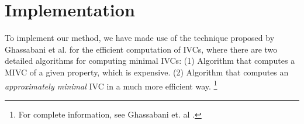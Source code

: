 \section{Implementation}
\label{sec:impl}

To implement our method, we have made use of the technique proposed by Ghassabani et al. \cite{Ghass16} for the efficient computation of IVCs, where there are two detailed algorithms for computing minimal IVCs: (1) Algorithm \ucbfalg that computes a MIVC of a given property, which is expensive. (2) Algorithm \ucalg that computes an \emph{approximately minimal} IVC in a much more efficient way. 
%
\footnote{For complete information, see Ghassabani et. al \cite{Ghass16}.}
